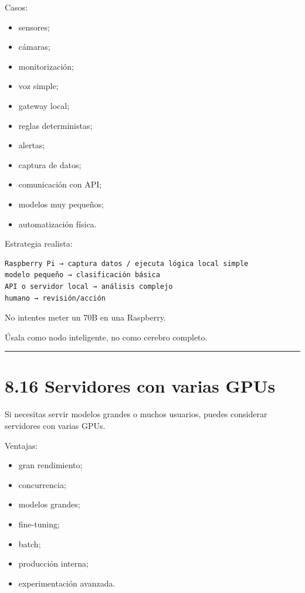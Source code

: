 Casos:

\begin{itemize}
\tightlist
\item
  sensores;
\item
  cámaras;
\item
  monitorización;
\item
  voz simple;
\item
  gateway local;
\item
  reglas deterministas;
\item
  alertas;
\item
  captura de datos;
\item
  comunicación con API;
\item
  modelos muy pequeños;
\item
  automatización física.
\end{itemize}

Estrategia realista:

\begin{lstlisting}
Raspberry Pi → captura datos / ejecuta lógica local simple
modelo pequeño → clasificación básica
API o servidor local → análisis complejo
humano → revisión/acción
\end{lstlisting}

No intentes meter un 70B en una Raspberry.

Úsala como nodo inteligente, no como cerebro completo.

\begin{center}\rule{0.5\linewidth}{0.5pt}\end{center}

\section{8.16 Servidores con varias
GPUs}\label{servidores-con-varias-gpus}

Si necesitas servir modelos grandes o muchos usuarios, puedes considerar
servidores con varias GPUs.

Ventajas:

\begin{itemize}
\tightlist
\item
  gran rendimiento;
\item
  concurrencia;
\item
  modelos grandes;
\item
  fine-tuning;
\item
  batch;
\item
  producción interna;
\item
  experimentación avanzada.
\end{itemize}

